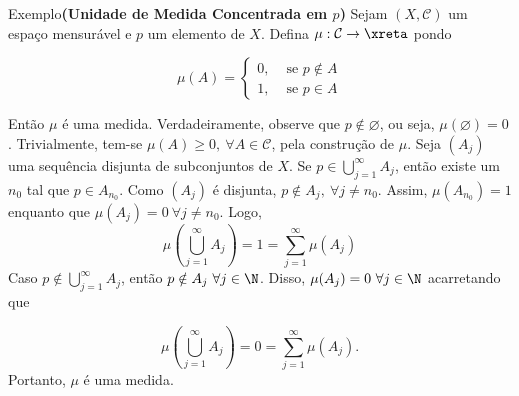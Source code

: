 \begin{env}{Exemplo}\textbf{(Unidade de Medida Concentrada em $p$)}
\label{ex:medida-concentrada-em-p}
    Sejam $(X, \mathcal{C})$ um espaço mensurável e $p$ um elemento de $X$.
    Defina $\mu: \mathcal{C} \to \xreta$ pondo

$$
\mu(A) = \left\{\begin{array}{cc}
0, & \textrm{\ se \ } p \notin A \\
1, & \textrm{\ se \ } p \in A 
\end{array}\right.$$


Então $\mu$ é uma medida.
Verdadeiramente, observe que $p \notin \varnothing$, ou seja, $\mu(\varnothing) = 0$.
Trivialmente, tem-se $\mu(A) \geq 0,\ \forall A \in \mathcal{C}$, pela construção de $\mu$.
Seja $(A_j)$ uma sequência disjunta de subconjuntos de $X$.
Se 
$
p \in \displaystyle \bigcup_{j = 1}^\infty A_j
$,
então existe um $n_0$ tal que $p \in A_{n_0}$.
Como $(A_j)$ é disjunta, $p \notin A_j, \ \forall j\neq n_0$.
Assim, $\mu(A_{n_0}) = 1$ enquanto que $\mu(A_j) = 0\ \forall j \neq n_0$.
Logo, 
$$
\mu\left( \bigcup_{j = 1}^\infty A_j\right)
=
1
=
\sum_{j=1}^{\infty} \mu(A_j)
$$
Caso
$
p \notin \displaystyle \bigcup_{j = 1}^\infty A_j
$,
então $p \notin A_j\ \forall j \in \N$.
Disso, $\mu(A_j) = 0\ \forall j \in \N$ acarretando que

$$
\mu\left( \bigcup_{j = 1}^\infty A_j\right)
=
0
=
\sum_{j=1}^{\infty} \mu(A_j).
$$
Portanto, $\mu$ é uma medida.
\end{env}
\begin{comment}
	

\begin{env}{Exemplo}
	\label{ex: função característica é uma medida}
	Seja $\cc$ uma \sigal e $E \subset \cc$.
	A função característica $\chi_{E}: \cc \to \R$ é uma medida sobre $\cc$.
	De fato, $\chi_{\varnothing} = 0$, pois não há elementos em $\varnothing$.
	Pela definição de função característica, temos que $\chi_E(x) \neq 0$ para qualquer que seja $E \in \cc$.
	Por fim, Se $(E_n)$ é uma sequência disjunta de elementos de $\cc$, sempre temos $\chi_{\bigcap_{n \in \N}E_n} = 0$.
	Caso $\chi_{\bigcup_{n \in \N}E_n}(x) = 0$, então $x \notin \bigcup_{n \in \N}E_n$. 
	Logo, $x \notin E_n,\ \forall n \in \N$.
	Logo, $\chi_{E_n}(x) = 0$ para qualquer que seja $n \in \N$, 
	Com isso, $\dsum_{n \in \N} \chi_{E_n}(x) = 0 = \chi_{\bigcup_{n \in \N}E_n}(x)$.
	
	Caso ocorra que  $\chi_{\bigcup_{n \in \N}E_n}(x) = 1$, então existe um $n_0 \in \N$ tal que $ x \in E_{n_0}$.
	Como a sequência de conjuntos é disjunta, o $n_0$ é único.
	Logo, $x \notin E_p$ para qualquer $p \neq n_0$, ou seja, $\chi_{E_p}(x) = 0, \ \forall p \neq n_0$.
	Com isso, $\dsum_{p \neq n_0} \chi_{E_p}(x) + \chi_{E_{n_0}}(x) = 0 + 1 =  \chi_{\bigcup_{n \in \N}E_n}(x)$.
	Em todo caso, $\chi_{\bigcup_{n \in \N}E_n}(x) = \dsum_{n \in \N} \chi_{E_n}(x)$. 
	Portanto, $\chi_E$ é uma medida.
\end{env}
\end{comment}

